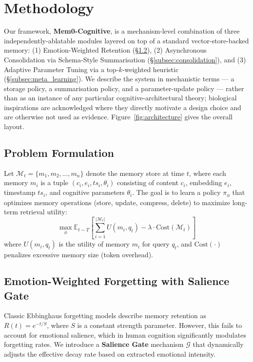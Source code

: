\section{Methodology}
\label{sec:methodology}

Our framework, \textbf{Mem0-Cognitive}, is a mechanism-level combination of three independently-ablatable modules layered on top of a standard vector-store-backed memory: (1) Emotion-Weighted Retention (\S\ref{subsec:forgetting}), (2) Asynchronous Consolidation via Schema-Style Summarisation (\S\ref{subsec:consolidation}), and (3) Adaptive Parameter Tuning via a top-$k$-weighted heuristic (\S\ref{subsec:meta_learning}). We describe the system in mechanistic terms --- a storage policy, a summarisation policy, and a parameter-update policy --- rather than as an instance of any particular cognitive-architectural theory; biological inspirations are acknowledged where they directly motivate a design choice and are otherwise not used as evidence. Figure~\ref{fig:architecture} gives the overall layout.

\subsection{Problem Formulation}
Let $\mathcal{M}_t = \{m_1, m_2, \dots, m_n\}$ denote the memory store at time $t$, where each memory $m_i$ is a tuple $(c_i, e_i, ts_i, \theta_i)$ consisting of content $c_i$, embedding $e_i$, timestamp $ts_i$, and cognitive parameters $\theta_i$. The goal is to learn a policy $\pi_\phi$ that optimizes memory operations (store, update, compress, delete) to maximize long-term retrieval utility:
\begin{equation}
    \max_\phi \mathbb{E}_{t \sim T} \left[ \sum_{i=1}^{|\mathcal{M}_t|} U(m_i, q_t) - \lambda \cdot \text{Cost}(\mathcal{M}_t) \right]
\end{equation}
where $U(m_i, q_t)$ is the utility of memory $m_i$ for query $q_t$, and $\text{Cost}(\cdot)$ penalizes excessive memory size (token overhead).

\subsection{Emotion-Weighted Forgetting with Salience Gate}
\label{subsec:forgetting}

Classic Ebbinghaus forgetting models describe memory retention as $R(t) = e^{-t/S}$, where $S$ is a constant strength parameter. However, this fails to account for emotional salience, which in human cognition significantly modulates forgetting rates. We introduce a \textbf{Salience Gate} mechanism $\mathcal{G}$ that dynamically adjusts the effective decay rate based on extracted emotional intensity.

